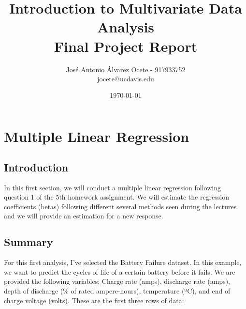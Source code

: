 \documentclass[11pt,a4paper]{article}
\title{Introduction to Multivariate Data Analysis
	\\\medskip \large Final Project Report}
\author{José Antonio Álvarez Ocete - 917933752 \\ jocete@ucdavis.edu}
\date{ \today }
\begin{document}
	
	
	\maketitle 
	\newpage
	\tableofcontents
	\newpage
	
	\section{Multiple Linear Regression}
	
	\subsection{Introduction}
	
	In this first section, we will conduct a multiple linear regression following question 1 of the 5th homework assignment. We will estimate the regression coefficients (betas) following different several methods seen during the lectures and we will provide an estimation for a new response.
	
	\subsection{Summary}
	
	For this first analysis, I've selected the Battery Failure dataset. In this example, we want to predict the cycles of life of a certain battery before it fails. We are provided the following variables: Charge rate (amps), discharge rate (amps), depth of discharge (\% of rated ampere-hours), temperature (ºC), and end of charge voltage (volts). These are the first three rows of data: 
	
\end{document}
